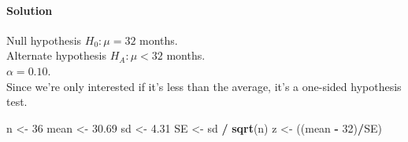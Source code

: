 \documentclass[]{article}
\newenvironment{Shaded}{\begin{snugshade}}{\end{snugshade}}
\newcommand{\KeywordTok}[1]{\textcolor[rgb]{0.13,0.29,0.53}{\textbf{#1}}}
\newcommand{\DecValTok}[1]{\textcolor[rgb]{0.00,0.00,0.81}{#1}}
\newcommand{\FloatTok}[1]{\textcolor[rgb]{0.00,0.00,0.81}{#1}}
\newcommand{\StringTok}[1]{\textcolor[rgb]{0.31,0.60,0.02}{#1}}
\newcommand{\OperatorTok}[1]{\textcolor[rgb]{0.81,0.36,0.00}{\textbf{#1}}}
\newcommand{\NormalTok}[1]{#1}
\let\oldparagraph\paragraph
\renewcommand{\paragraph}[1]{\oldparagraph{#1}\mbox{}}
\begin{document}
\paragraph{Solution}\label{solution-13}

Null hypothesis \(H_0: \mu = 32\) months.\\
Alternate hypothesis \(H_A: \mu < 32\) months.\\
\(\alpha = 0.10\).\\
Since we're only interested if it's less than the average, it's a
one-sided hypothesis test.

\begin{Shaded}
\begin{Highlighting}[]
\NormalTok{n <-}\StringTok{ }\DecValTok{36}
\NormalTok{mean <-}\StringTok{ }\FloatTok{30.69}
\NormalTok{sd <-}\StringTok{ }\FloatTok{4.31}
\NormalTok{SE <-}\StringTok{ }\NormalTok{sd }\OperatorTok{/}\StringTok{ }\KeywordTok{sqrt}\NormalTok{(n)}
\NormalTok{z <-}\StringTok{ }\NormalTok{((mean }\OperatorTok{-}\StringTok{ }\DecValTok{32}\NormalTok{)}\OperatorTok{/}\NormalTok{SE)}
\end{Highlighting}
\end{Shaded}
\end{document}
